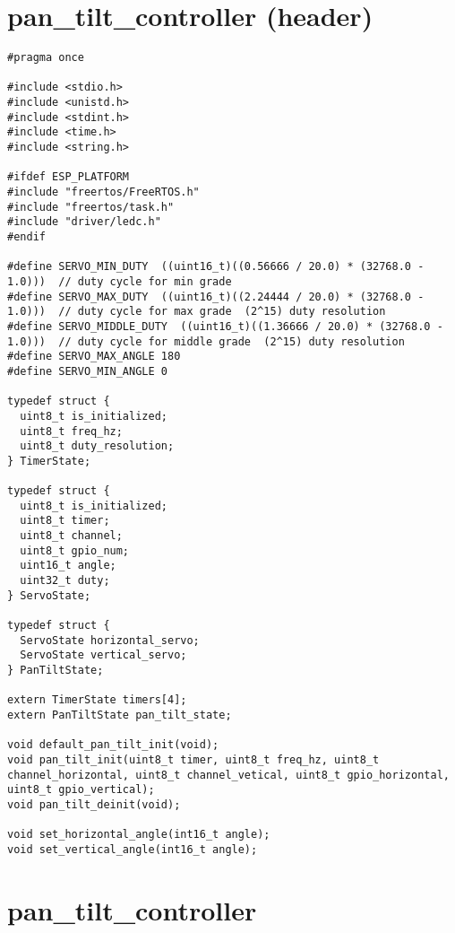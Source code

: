 \section{pan\_tilt\_controller (header)}
\label{appendix:pantiltcontrollerheader}

\begin{lstlisting}
#pragma once

#include <stdio.h>
#include <unistd.h>
#include <stdint.h>
#include <time.h>
#include <string.h>

#ifdef ESP_PLATFORM
#include "freertos/FreeRTOS.h"
#include "freertos/task.h"
#include "driver/ledc.h"
#endif

#define SERVO_MIN_DUTY  ((uint16_t)((0.56666 / 20.0) * (32768.0 - 1.0)))  // duty cycle for min grade
#define SERVO_MAX_DUTY  ((uint16_t)((2.24444 / 20.0) * (32768.0 - 1.0)))  // duty cycle for max grade  (2^15) duty resolution
#define SERVO_MIDDLE_DUTY  ((uint16_t)((1.36666 / 20.0) * (32768.0 - 1.0)))  // duty cycle for middle grade  (2^15) duty resolution
#define SERVO_MAX_ANGLE 180
#define SERVO_MIN_ANGLE 0

typedef struct {
  uint8_t is_initialized;
  uint8_t freq_hz;
  uint8_t duty_resolution;
} TimerState;

typedef struct {
  uint8_t is_initialized;
  uint8_t timer;
  uint8_t channel;
  uint8_t gpio_num;
  uint16_t angle;
  uint32_t duty;
} ServoState;

typedef struct {
  ServoState horizontal_servo;
  ServoState vertical_servo; 
} PanTiltState;

extern TimerState timers[4];
extern PanTiltState pan_tilt_state;

void default_pan_tilt_init(void);
void pan_tilt_init(uint8_t timer, uint8_t freq_hz, uint8_t channel_horizontal, uint8_t channel_vetical, uint8_t gpio_horizontal, uint8_t gpio_vertical);
void pan_tilt_deinit(void);

void set_horizontal_angle(int16_t angle);
void set_vertical_angle(int16_t angle);
\end{lstlisting}

\section{pan\_tilt\_controller}
\label{appendix:pantiltcontroller}

